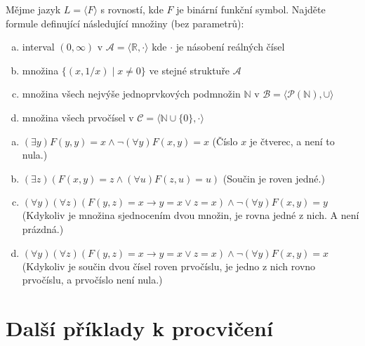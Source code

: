 \begin{problem}

    Mějme jazyk $L=\langle F \rangle$ s rovností, kde $F$ je binární funkční symbol. Najděte formule definující následující množiny (bez parametrů):
    \begin{enumerate}[(a)]
        \item interval $(0,\infty)$ v $\mathcal A=\langle\mathbb R, \cdot\rangle$ kde $\cdot$ je násobení reálných čísel
        \item množina $\{(x, 1/x)\mid x\neq 0\}$ ve stejné struktuře $\mathcal A$
        \item množina všech nejvýše jednoprvkových podmnožin $\mathbb N$ v $\mathcal B=\langle\mathcal P(\mathbb N),\cup\rangle$
        \item množina všech prvočísel v $\mathcal C=\langle \mathbb N\cup\{0\}, \cdot\rangle$
    \end{enumerate}

    \begin{solution}

        \begin{enumerate}[(a)]
            \item $(\exists y)F(y,y)=x\land \neg (\forall y)F(x,y)=x$ (Číslo $x$ je čtverec, a není to nula.)
            \item $(\exists z)(F(x,y)=z\land(\forall u)F(z,u)=u)$ (Součin je roven jedné.)
            \item $(\forall y)(\forall z)(F(y,z)=x\to y=x\lor z=x)\land\neg(\forall y)F(x,y)=y$ (Kdykoliv je množina sjednocením dvou množin, je rovna jedné z nich. A není prázdná.)
            \item $(\forall y)(\forall z)(F(y,z)=x\to y=x\lor z=x)\land\neg(\forall y)F(x,y)=x$ (Kdykoliv je součin dvou čísel roven prvočíslu, je jedno z nich rovno prvočíslu, a prvočíslo není nula.)
        \end{enumerate}
                    
    \end{solution}

\end{problem}
        
        
\section*{Další příklady k procvičení}


